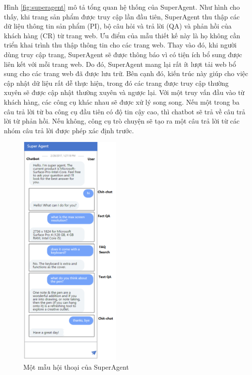 Hình \ref{fig:superagent} mô tả tổng quan hệ thống của SuperAgent.
Như hình cho thấy, khi trang sản phẩm được truy cập lần đầu tiên,
SuperAgent thu thập các dữ liệu thông tin sản phẩm (PI), bộ câu hỏi
và trả lời (QA) và phản hồi của khách hàng (CR) từ trang web. Ưu điểm
của mẫu thiết kế này là họ không cần triển khai trình thu thập
thông tin cho các trang web. Thay vào đó, khi người dùng truy cập
trang, SuperAgent sẽ được thông báo vì có tiện ích bổ sung được
liên kết với mỗi trang web. Do đó, SuperAgent mang lại rất ít lượt
tải web bổ sung cho các trang web đã được lưu trữ. Bên cạnh đó,
kiến trúc này giúp cho việc cập nhật dữ liệu rất dễ thực hiện,
trong đó các trang được truy cập thường xuyên sẽ được cập nhật
thường xuyên và ngược lại. Với một truy vấn đầu vào từ khách hàng,
các công cụ khác nhau sẽ được xử lý song song. Nếu một trong ba câu
trả lời từ ba công cụ đầu tiên có độ tin cậy cao, thì chatbot sẽ
trả về câu trả lời từ phản hồi. Nếu không, công cụ trò chuyện sẽ
tạo ra một câu trả lời từ các nhóm câu trả lời được phép xác định
trước.

\begin{figure}[ht]
    \centering
    \includegraphics[width=0.45\textwidth]{thesis/chatbot/congtrinh/img/superagentdialog.png}
    \caption{Một mẫu hội thoại của SuperAgent}
    \label{fig:superagentdialog}
\end{figure}

